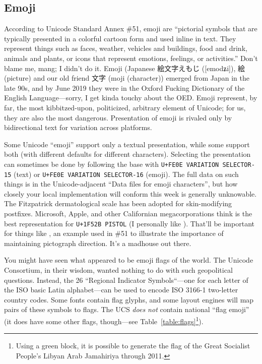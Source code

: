 \subsection{Emoji}
According to Unicode Standard Annex \#51\cite{annex51}, emoji are ``pictorial
symbols that are typically presented in a colorful cartoon form and used
inline in text. They represent things such as faces, weather, vehicles and
buildings, food and drink, animals and plants, or icons that represent
emotions, feelings, or activities.''
Don't blame me, mang; I didn't do it. Emoji (Japanese 絵文字えもじ ([{emodʑi}]),
絵 (picture) and our old friend 文字 (moji (character)) emerged from Japan
in the late 90s, and by June 2019 they were in the Oxford Fucking Dictionary of
the English Language\cite{oedgay}---sorry, I get kinda touchy about the OED.
Emoji represent, by far, the most kibbitzed-upon, politicized, arbitrary
element of Unicode; for us, they are also the most dangerous. Presentation of
emoji is rivaled only by bidirectional text for variation across platforms.

Some Unicode ``emoji'' support only a textual presentation, while some
support both (with different defaults for different characters). Selecting
the presentation can sometimes be done by following the base with \texttt{U+FE0E VARIATION SELECTOR-15} (text)
or \texttt{U+FE0E VARIATION SELECTOR-16} (emoji). The full data on such things
is in the Unicode-adjacent ``Data files for emoji characters'', but how closely
your local implementation will conform this week is generally unknowable. The
Fitzpatrick dermatological scale has been adopted for skin-modifying postfixes.
Microsoft, Apple, and other Californian megacorporations think
 is the best representation for
 \texttt{U+1F52B PISTOL} (I personally like
). That'll be important for things like
{}, an example used in \#51 to illustrate the
importance of maintaining pictograph direction. It's a madhouse out there.

You might have seen what appeared to be emoji flags of the world. The Unicode
Consortium, in their wisdom, wanted nothing to do with such geopolitical
questions. Instead, the 26 ``Regional Indicator Symbols``---one for each
letter of the ISO basic Latin alphabet\cite{iso646}---can be used to encode
ISO 3166-1\cite{iso3166} two-letter country codes\cite{darkcorners}. Some fonts contain flag
glyphs, and some layout engines will map pairs of these symbols to flags. The
UCS \textit{does not} contain national ``flag emoji'' (it does have some other
flags, though---see Table~\ref{table:flags}\footnote{Using a green block,
it is possible to generate the flag of the Great Socialist People's Libyan Arab Jamahiriya through 2011.}).

